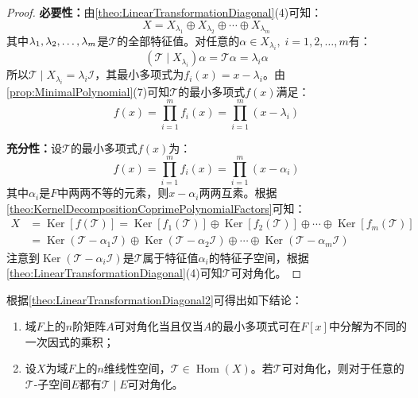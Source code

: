 \begin{proof}
	\textbf{必要性：}由\cref{theo:LinearTransformationDiagonal}(4)可知：
	\begin{equation*}
		X=X_{\lambda_1}\oplus X_{\lambda_2}\oplus\cdots\oplus X_{\lambda_m}
	\end{equation*}
	其中$\lambda_1, \lambda_2, \dots, \lambda_{m}$是$\mathcal{T}$的全部特征值。对任意的$\alpha\in X_{\lambda_i},\;i=1,2,\dots,m$有：
	\begin{equation*}
		(\mathcal{T}\mid X_{\lambda_i})\alpha=\mathcal{T}\alpha=\lambda_i\alpha
	\end{equation*}
	所以$\mathcal{T}\mid X_{\lambda_i}=\lambda_i\mathcal{I}$，其最小多项式为$f_i(x)=x-\lambda_i$。由\cref{prop:MinimalPolynomial}(7)可知$\mathcal{T}$的最小多项式$f(x)$满足：
	\begin{equation*}
		f(x)=\prod_{i=1}^{m}f_i(x)=\prod_{i=1}^{m}(x-\lambda_i)
	\end{equation*}\par
	\textbf{充分性：}设$\mathcal{T}$的最小多项式$f(x)$为：
	\begin{equation*}
		f(x)=\prod_{i=1}^{m}f_i(x)=\prod_{i=1}^{m}(x-\alpha_i)
	\end{equation*}
	其中$\alpha_i$是$F$中两两不等的元素，则$x-\alpha_i$两两互素。根据\cref{theo:KernelDecompositionCoprimePolynomialFactors}可知：
	\begin{align*}
		X&=\operatorname{Ker}[f(\mathcal{T})]=\operatorname{Ker}[f_1(\mathcal{T})]\oplus\operatorname{Ker}[f_2(\mathcal{T})]\oplus\cdots\oplus\operatorname{Ker}[f_m(\mathcal{T})] \\
		&=\operatorname{Ker}(\mathcal{T}-\alpha_1\mathcal{I})\oplus\operatorname{Ker}(\mathcal{T}-\alpha_2\mathcal{I})\oplus\cdots\oplus\operatorname{Ker}(\mathcal{T}-\alpha_m\mathcal{I})
	\end{align*}
	注意到$\operatorname{Ker}(\mathcal{T}-\alpha_i\mathcal{I})$是$\mathcal{T}$属于特征值$\alpha_i$的特征子空间，根据\cref{theo:LinearTransformationDiagonal}(4)可知$\mathcal{T}$可对角化。
\end{proof}
\begin{corollary}
	根据\cref{theo:LinearTransformationDiagonal2}可得出如下结论：
	\begin{enumerate}
		\item 域$F$上的$n$阶矩阵$A$可对角化当且仅当$A$的最小多项式可在$F[x]$中分解为不同的一次因式的乘积；
		\item 设$X$为域$F$上的$n$维线性空间，$\mathcal{T}\in\operatorname{Hom}(X)$。若$\mathcal{T}$可对角化，则对于任意的$\mathcal{T}$-子空间$E$都有$\mathcal{T}\mid E$可对角化。
	\end{enumerate}
\end{corollary}
